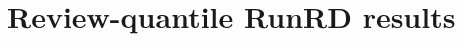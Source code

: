 \documentclass[11pt]{article}
\begin{document}
\section{Review-quantile RunRD results}

\end{document}
